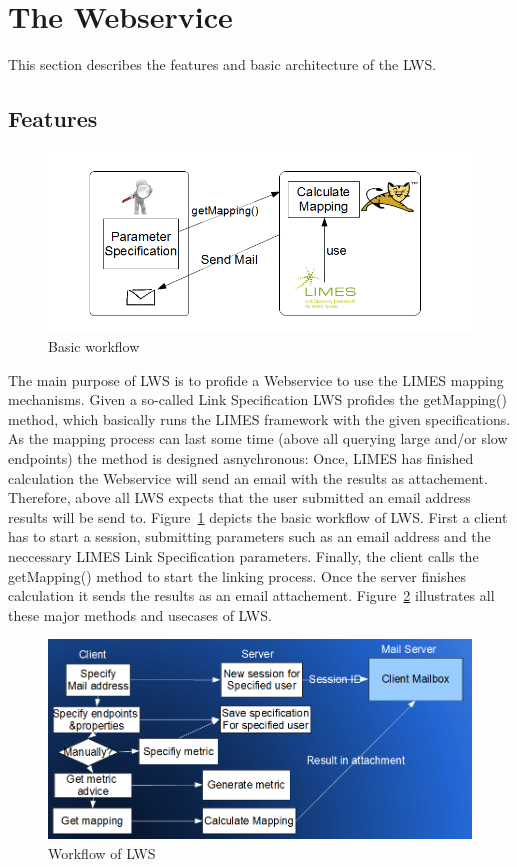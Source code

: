 \documentclass{article}
\begin{document}
\section{The Webservice}
This section describes the features and basic architecture of the LWS.
\subsection{Features}
\begin{figure}[htbp]
	\centering
		\includegraphics[width=7in]{images/limes_webservice_workflow_skizze_for_dummies.png}
	\caption{Basic workflow}
	\label{fig:limes_webservice_workflow_skizze_for_dummies}
\end{figure}
The main purpose of LWS is to profide a Webservice to use the LIMES mapping mechanisms. Given a so-called Link Specification LWS profides the getMapping() method, which basically runs the LIMES framework with the given specifications. As the mapping process can last some time (above all querying large and/or slow endpoints) the method is designed asnychronous: Once, LIMES has finished calculation the Webservice  will send an email with the results as attachement. Therefore, above all LWS expects that the user submitted an email address results will be send to.
Figure~\ref{fig:limes_webservice_workflow_skizze_for_dummies} depicts the basic workflow of LWS. First a client has to start a session, submitting parameters such as an email address and the neccessary LIMES Link Specification parameters. Finally, the client calls the getMapping() method to start the linking process. Once the server finishes calculation it sends the results as an email attachement. Figure~\ref{fig:workflow2} illustrates all these major methods and usecases of LWS.
\begin{figure}[h]
	\centering
		\includegraphics[width=7in]{images/workflow2.png}
	\caption{Workflow of LWS}
	\label{fig:workflow2}
\end{figure}
\end{document}
